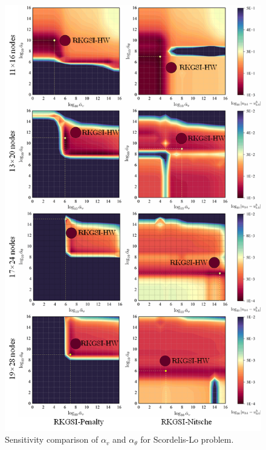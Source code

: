 \begin{figure}[!ht]
\centering
\DIFdelbeginFL %
\DIFdelendFL \DIFaddbeginFL \includegraphics[width=\textwidth]{figures/sla_r1}
\DIFaddendFL \caption{Sensitivity comparison of $\alpha_v$ and $\alpha_\theta$ for Scordelis-Lo problem.}\label{slf3}
\end{figure}

